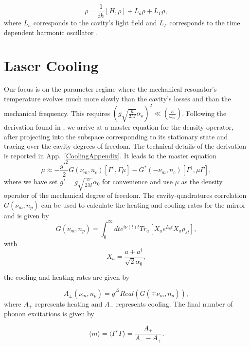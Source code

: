 \documentclass[reprint, amsmath,amssymb, aps,pra]{revtex4-1}
\begin{document}
\begin{equation}\label{LCMasterEq}
\dot{\rho} = \frac{1}{i\hbar}[H,\rho] +L_a\rho + L_\Gamma \rho,
\end{equation} where $L_a$ corresponds to the cavity's light field \cite{ZollerQN} and $L_\Gamma$ corresponds to the time dependent harmonic oscillator \cite{HanngiFM}.


\section{Laser Cooling}\label{LasCool}

Our focus is on the parameter regime where the mechanical resonator's
temperature evolves much more slowly than the cavity's losses and than
the mechanical frequency. This requires
$(g\sqrt{\frac{\hbar}{2M}}\alpha_o)^2 \ll (\frac{\kappa}{\omega_m})$. Following the
derivation found in \cite{LCNooshi}, we arrive at a master equation
for the density operator, after projecting into the subspace corresponding to
its stationary state and tracing over the cavity degrees of freedom. The technical details of the derivation is reported in App.~\ref{CoolingAppendix}. It leads to the master equation 
\begin{equation}\label{eq:projected_master_equation}
\dot{\mu}\approx -\frac{g'^2}{2}G(\nu_m,n_c)[\Gamma^\dagger,\Gamma\mu]-G^*(-\nu_m,n_c)[\Gamma^\dagger,\mu\Gamma],
\end{equation} where we have set $g'=g\sqrt{\frac{\hbar}{2M}}\alpha_0$  for convenience and use $\mu$ as the density operator of the mechanical degree of freedom. The
cavity-quadratures correlation $G(\nu_m,n_p)$ can be used to calculate the heating and cooling rates
for the mirror and is given by
\begin{equation} \label{CavityQuadrature}
G(\nu_m,n_p) = \int_0^\infty dt e^{i\nu(t) t}Tr_a[X_a e^{L_a t} X_a \rho_{st}],
\end{equation} with 
\begin{equation}
X_a = \frac{a + a^\dagger}{\sqrt{2}\alpha_0},
\end{equation}

the cooling and heating rates are given by


\begin{equation}
A_\pm(\nu_m,n_p) = g'^2Real(G(\mp \nu_m,n_p)),
\end{equation} where $A_+$ represents heating and $A_-$ represents cooling. The final number of phonon excitations is given by

\begin{equation}
\langle m \rangle =\langle \Gamma^\dagger \Gamma \rangle = \frac{A_+}{A_- - A_+}.
\end{equation}
\end{document}

